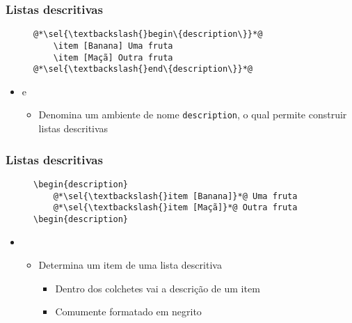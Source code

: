 \begin{frame}[fragile] \frametitle{Listas descritivas}
\begin{figure}[!t]
\begin{lstlisting}
@*\sel{\textbackslash{}begin\{description\}}*@
	\item [Banana] Uma fruta
	\item [Maçã] Outra fruta
@*\sel{\textbackslash{}end\{description\}}*@
\end{lstlisting}
\end{figure}

\begin{itemize}
	\item {} e 
	\begin{itemize}
		\item Denomina um ambiente de nome \texttt{description}, o qual permite construir listas descritivas
	\end{itemize}
\end{itemize}
\end{frame}

\begin{frame}[fragile] \frametitle{Listas descritivas}
\begin{figure}[!t]
\begin{lstlisting}
\begin{description}
	@*\sel{\textbackslash{}item [Banana]}*@ Uma fruta
	@*\sel{\textbackslash{}item [Maçã]}*@ Outra fruta
\begin{description}
\end{lstlisting}
\end{figure}

\begin{itemize}
	\item {}
	\begin{itemize}
		\item Determina um item de uma lista descritiva
		\begin{itemize}
			\item Dentro dos colchetes vai a descrição de um item
			\item Comumente formatado em negrito
		\end{itemize}
	\end{itemize}
\end{itemize}
\end{frame}

